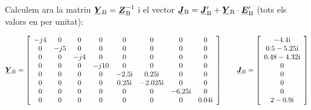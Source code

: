 \begin{exemple}
    Calculem ara la matriu $\mcmplx{Y}\ped{B}=\mcmplx{Z}\ped{B}^{-1}$ i el vector $\mcmplx{J}\ped{B} = \mcmplx{J}\ped{B}' + \mcmplx{Y}\ped{B} \cdot\mcmplx{E}\ped{B}'$  (tots els valors en per unitat):

    \[
       \mcmplx{Y}\ped{B} =
       \begin{bmatrix}\begin{array}{cccccccc}
         -j 4 & 0 & 0 & 0 & 0 & 0 & 0 & 0 \\
         0 & -j 5 & 0 & 0 & 0 & 0 & 0 & 0 \\
         0 & 0 & -j 4 & 0 & 0 & 0 & 0 & 0 \\
         0 & 0 & 0 & -j 10 & 0 & 0 & 0 & 0 \\
         0 & 0 & 0 & 0 & \complexnum{-j 2,5} & \complexnum{j 0,25} & 0 & 0 \\
         0 & 0 & 0 & 0 & \complexnum{j 0,25} & \complexnum{-j 2,025} & 0 & 0 \\
         0 & 0 & 0 & 0 & 0 & 0 & \complexnum{-j 6,25} & 0 \\
         0 & 0 & 0 & 0 & 0 & 0 & 0 & \complexnum{j 0,04}
    \end{array}\end{bmatrix}
       \qquad
       \mcmplx{J}\ped{B} =
       \begin{bmatrix}\begin{array}{c}
        \complexnum{-j 4,4} \\
        \complexnum{0,5 - j 5,25} \\
        \complexnum{0,48 - j 4,32} \\
        0 \\
        0 \\
        0 \\
        0 \\
        \complexnum{2 - j 0,9}
    \end{array}\end{bmatrix}
    \]


\end{exemple}
